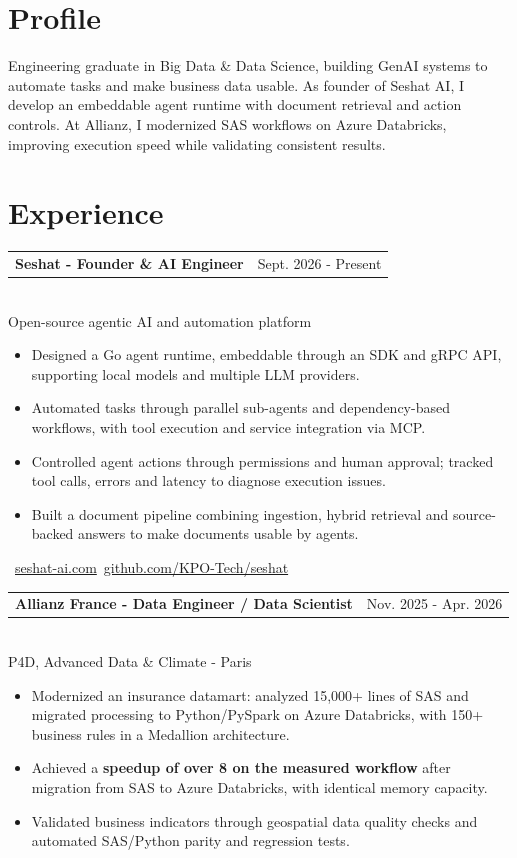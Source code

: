 \documentclass[10pt,a4paper]{article}
\makeatletter
\newcommand{\role}[3]{%
  \vspace{3pt}
  \begin{tabularx}{\linewidth}{@{}Xr@{}}
  \textbf{#1} & {\color{muted}#2}
  \end{tabularx}\vspace{0.8pt}\\
  {\color{muted}#3}\par
  \vspace{3pt}
}
\makeatother
\begin{document}
\begin{lrbox}{\maincolumnbox}
\begin{minipage}[t]{0.695\textwidth}
\vspace{0pt}
\raggedright

\section{Profile}
Engineering graduate in Big Data \& Data Science, building GenAI systems to automate tasks and make business data usable. As founder of Seshat AI, I develop an embeddable agent runtime with document retrieval and action controls. At Allianz, I modernized SAS workflows on Azure Databricks, improving execution speed while validating consistent results.

\section{Experience}
\role{Seshat - Founder \& AI Engineer}{Sept. 2026 - Present}{Open-source agentic AI and automation platform}
\begin{itemize}
  \item Designed a Go agent runtime, embeddable through an SDK and gRPC API, supporting local models and multiple LLM providers.
  \item Automated tasks through parallel sub-agents and dependency-based workflows, with tool execution and service integration via MCP.
  \item Controlled agent actions through permissions and human approval; tracked tool calls, errors and latency to diagnose execution issues.
  \item Built a document pipeline combining ingestion, hybrid retrieval and source-backed answers to make documents usable by agents.
\end{itemize}
{\footnotesize\color{accent}\ \href{https://seshat-ai.com}{seshat-ai.com}\enspace\textbullet\enspace{}\ \href{https://github.com/KPO-Tech/seshat}{github.com/KPO-Tech/seshat}}\par

\vspace{8pt}
\role{Allianz France - Data Engineer / Data Scientist}{Nov. 2025 - Apr. 2026}{P4D, Advanced Data \& Climate - Paris}
\begin{itemize}
  \item Modernized an insurance datamart: analyzed 15,000+ lines of SAS and migrated processing to Python/PySpark on Azure Databricks, with 150+ business rules in a Medallion architecture.
  \item Achieved a \textbf{speedup of over 8\texttimes{} on the measured workflow} after migration from SAS to Azure Databricks, with identical memory capacity.
  \item Validated business indicators through geospatial data quality checks and automated SAS/Python parity and regression tests.
\end{itemize}


\end{minipage}
\end{lrbox}
\end{document}
